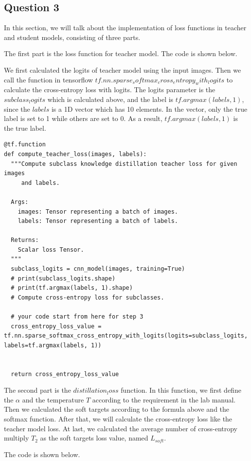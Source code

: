 \documentclass[conference]{IEEEtran}
\begin{document}
\subsection{Question 3}
In this section, we will talk about the implementation of loss functions in teacher and student models, consisting of three parts.\par
The first part is the loss function for teacher model. The code is shown below.\par 
We first calculated the logits of teacher model using the input images. Then we call the function in tensorflow $tf.nn.sparse_softmax_cross_entropy_with_logits$ to calculate the cross-entropy loss with logits. 
The logits parameter is the $subclass_logits$ which is calculated above, and the label is $tf.argmax(labels, 1)$, since the $labels$ is a 1D vector which has 10 elements. In the vector, only the true label is set to 1 while others are set to 0.
As a result, $tf.argmax(labels, 1)$ is the true label.
\begin{lstlisting}
@tf.function
def compute_teacher_loss(images, labels):
  """Compute subclass knowledge distillation teacher loss for given images
     and labels.

  Args:
    images: Tensor representing a batch of images.
    labels: Tensor representing a batch of labels.

  Returns:
    Scalar loss Tensor.
  """
  subclass_logits = cnn_model(images, training=True)
  # print(subclass_logits.shape)
  # print(tf.argmax(labels, 1).shape)
  # Compute cross-entropy loss for subclasses.

  # your code start from here for step 3
  cross_entropy_loss_value = tf.nn.sparse_softmax_cross_entropy_with_logits(logits=subclass_logits, labels=tf.argmax(labels, 1))


  return cross_entropy_loss_value
\end{lstlisting}
The second part is the $distillation_loss$ function. 
In this function, we first define the $\alpha$ and the temperature $T$ according to the requirement in the lab manual.
Then we calculated the soft targets according to the formula above and the softmax function.
After that, we will calculate the cross-entropy loss like the teacher model loss.
At last, we calculated the average number of cross-entropy multiply $T_{2}$ as the soft targets loss value, named $L_{soft}$.\par
The code is shown below.
\end{document}
